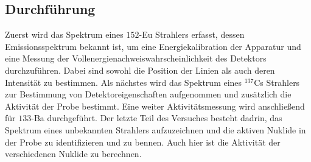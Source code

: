 \cite{aufbau}
\subsection{Durchführung}
Zuerst wird das Spektrum eines $152$-Eu Strahlers erfasst, dessen Emissionsspektrum bekannt ist, um eine Energiekalibration der Apparatur und eine Messung der
Vollenergienachweiswahrscheinlichkeit des Detektors durchzuführen. Dabei sind sowohl die Position der Linien als auch deren Intensität zu bestimmen.
Als nächstes wird das Spektrum eines $^{137}$Cs Strahlers zur Bestimmung von Detektoreigenschaften aufgenommen und zusätzlich die Aktivität der Probe
bestimmt. Eine weiter Aktivitätsmessung wird anschließend für ${133}$-Ba durchgeführt. Der letzte Teil des Versuches besteht dadrin, das Spektrum eines
unbekannten Strahlers aufzuzeichnen und die aktiven Nuklide in der Probe zu identifizieren und zu bennen. Auch hier ist die Aktivität der 
verschiedenen Nuklide zu berechnen.



